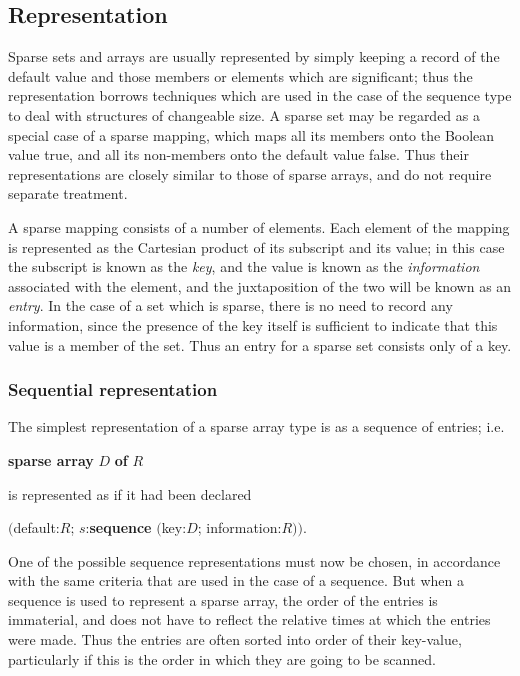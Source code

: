 \subsection{Representation}

\noindent
Sparse sets and arrays are usually represented by simply keeping a record of the default value and those members or elements which are significant; thus the representation borrows techniques which are used in the case of the sequence type to deal with structures of changeable size. A sparse set may be regarded as a special case of a sparse mapping, which maps all its members onto the Boolean value true, and all its non-members onto the default value false. Thus their representations are closely similar to those of sparse arrays, and do not require separate treatment.

A sparse mapping consists of a number of elements. Each element of the mapping is represented as the Cartesian product of its subscript and its value; in this case the subscript is known as the \textit{key}, and the value is known as the \textit{information} associated with the element, and the juxtaposition of the two will be known as an \textit{entry}. In the case of a set which is sparse, there is no need to record any information, since the presence of the key itself is sufficient to indicate that this value is a member of the set. Thus an entry for a sparse set consists only of a key.

\subsubsection{Sequential representation}

The simplest representation of a sparse array type is as a sequence of entries;
i.e.

\quad \textbf{sparse array} $D$ \textbf{of} $R$

\noindent
is represented as if it had been declared

\quad $($default:$R$; $s$:\textbf{sequence} $($key:$D$; information:$R))$.

One of the possible sequence representations must now be chosen, in accordance with the same criteria that are used in the case of a sequence. But when a sequence is used to represent a sparse array, the order of the entries is immaterial, and does not have to reflect the relative times at which the entries were made. Thus the entries are often sorted into order of their
key-value, particularly if this is the order in which they are going to be scanned.

